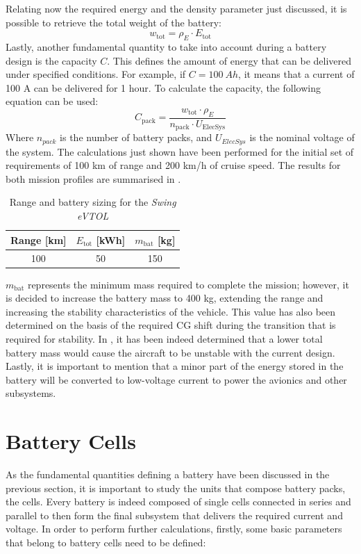Relating now the required energy and the density parameter just discussed,
it is possible to retrieve the total weight of the battery:
\begin{equation}
    w_\text{tot} = \rho_E \cdot E_\text{tot}
\end{equation}
Lastly, another fundamental quantity to take into account during a battery design is the capacity $C$.
This defines the amount of energy that can be delivered under specified conditions.
For example, if $C = \qty{100}{Ah}$, it means that a current of 100 A can be delivered for 1 hour.
To calculate the capacity, the following equation can be used:
\begin{equation}
    C_\text{pack} = \frac{w_\text{tot} \cdot \rho_E}{n_\text{pack} \cdot U_\text{ElecSys}} \label{capa}
\end{equation}
Where $n_{pack}$ is the number of battery packs, and $U_{ElecSys}$ is the nominal voltage of the system.
The calculations just shown have been performed for the initial set of requirements of 100 km of range and 200 km/h of cruise speed.
The results for both mission profiles are summarised in .

\begin{table}[htpb]
\centering
\caption{Range and battery sizing for the \textit{Swing eVTOL}}
\label{tab:range_table}
\begin{tabular}{ccc}
\toprule
\textbf{Range} {[}km{]} & \textbf{$E_\text{tot}$} {[}kWh{]} & \textbf{$m_\text{bat}$} {[}kg{]} \\
\midrule
100            & 50                   & 150                 \\
\bottomrule
\end{tabular}
\end{table}

$m_{\text{bat}}$ represents the minimum mass required to complete the mission; however, it is decided to increase the battery mass to 400 kg,
extending the range and increasing the stability characteristics of the vehicle.
This value has also been determined on the basis of the required CG shift during the transition that is required for stability. In , it has been indeed determined that a lower total battery mass would cause the aircraft to be unstable with the current design.
Lastly, it is important to mention that a minor part of the energy stored in the battery will be converted to low-voltage current to power the avionics and other subsystems.

\section{Battery Cells}
\label{sec:batt_cells}
As the fundamental quantities defining a battery have been discussed in the previous section,
it is important to study the units that compose battery packs, the cells.
Every battery is indeed composed of single cells connected in series
and parallel to then form the final subsystem that delivers the required current and voltage.
In order to perform further calculations, firstly,
some basic parameters that belong to battery cells need to be defined:

